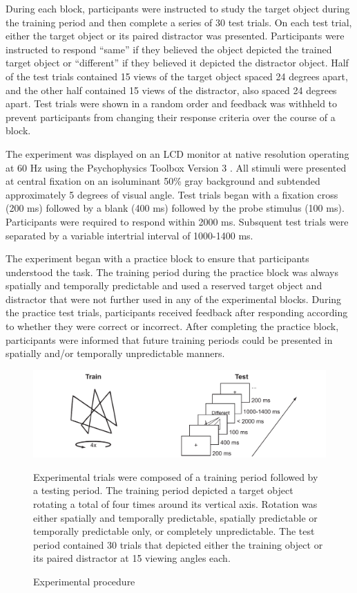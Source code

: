\documentclass[dwyatte_dissertation.tex]{subfiles}
\begin{document}
During each block, participants were instructed to study the target object during the training period and then complete a series of 30 test trials. On each test trial, either the target object or its paired distractor was presented. Participants were instructed to respond ``same'' if they believed the object depicted the trained target object or ``different'' if they believed it depicted the distractor object. Half of the test trials contained 15 views of the target object spaced 24 degrees apart, and the other half contained 15 views of the distractor, also spaced 24 degrees apart. Test trials were shown in a random order and feedback was withheld to prevent participants from changing their response criteria over the course of a block. 

The experiment was displayed on an LCD monitor at native resolution operating at 60 Hz using the Psychophysics Toolbox Version 3 \cite{Brainard97,Pelli97}. All stimuli were presented at central fixation on an isoluminant 50\% gray background and subtended approximately 5 degrees of visual angle. Test trials began with a fixation cross (200 ms) followed by a blank (400 ms) followed by the probe stimulus (100 ms). Participants were required to respond within 2000 ms. Subsquent test trials were separated by a variable intertrial interval of 1000-1400 ms.

The experiment began with a practice block to ensure that participants understood the task. The training period during the practice block was always spatially and temporally predictable and used a reserved target object and distractor that were not further used in any of the experimental blocks. During the practice test trials, participants received feedback after responding according to whether they were correct or incorrect. After completing the practice block, participants were informed that future training periods could be presented in spatially and/or temporally unpredictable manners.

\begin{figure}[h!]
\includegraphics[width=160mm]{figs/chap_bpleast/paperclip_task.pdf} \\
\caption{Experimental procedure}{Experimental trials were composed of a training period followed by a testing period. The training period depicted a target object rotating a total of four times around its vertical axis. Rotation was either spatially and temporally predictable, spatially predictable or temporally predictable only, or completely unpredictable. The test period contained 30 trials that depicted either the training object or its paired distractor at 15 viewing angles each.}
\label{fig:bpleast_task}
\end{figure}
\end{document}
